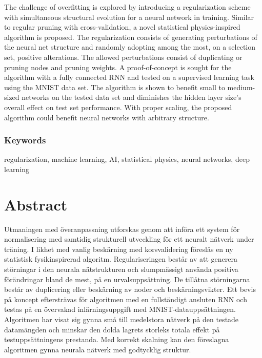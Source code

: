 The challenge of overfitting is explored by introducing a regularization scheme with simultaneous structural evolution for a neural network in training. Similar to regular pruning with cross-validation, a novel statistical physics-inspired algorithm is proposed. The regularization consists of generating perturbations of the neural net structure and randomly adopting among the most, on a selection set, positive alterations. The allowed perturbations consist of duplicating or pruning nodes and pruning weights. A proof-of-concept is sought for the algorithm with a fully connected RNN and tested on a supervised learning task using the MNIST data set. The algorithm is shown to benefit small to medium-sized networks on the tested data set and diminishes the hidden layer size's overall effect on test set performance. With proper scaling, the proposed algorithm could benefit neural networks with arbitrary structure.


\subsection*{Keywords}
regularization, machine learning, AI, statistical physics, neural networks, deep learning


\newpage
\thispagestyle{plain}
\chapter*{Abstract}
Utmaningen med överanpassning utforskas genom att införa ett system för normalisering med samtidig strukturell utveckling för ett neuralt nätverk under träning. I likhet med vanlig beskärning med korsvalidering föreslås en ny statistisk fysikinspirerad algoritm. Regulariseringen består av att generera störningar i den neurala nätstrukturen och slumpmässigt använda positiva förändringar bland de mest, på en urvalsuppsättning. De tillåtna störningarna består av duplicering eller beskärning av noder och beskärningsvikter. Ett bevis på koncept eftersträvas för algoritmen med en fullständigt ansluten RNN och testas på en övervakad inlärningsuppgift med MNIST-datauppsättningen. Algoritmen har visat sig gynna små till medelstora nätverk på den testade datamängden och minskar den dolda lagrets storleks totala effekt på testuppsättningens prestanda. Med korrekt skalning kan den föreslagna algoritmen gynna neurala nätverk med godtycklig struktur.

